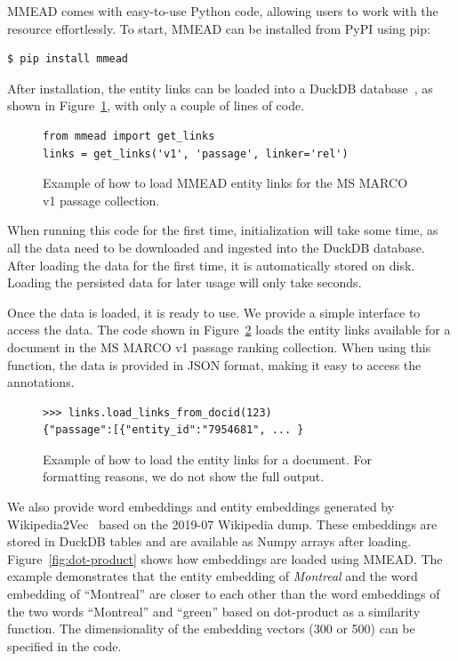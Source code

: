 MMEAD comes with easy-to-use Python code, allowing users to work with the resource effortlessly. To start, MMEAD can be installed from PyPI using pip:

\begin{verbatim}
$ pip install mmead
\end{verbatim}

After installation, the entity links can be loaded into a DuckDB database~\citep{duckdb}, as shown in Figure~\ref{fig:load-links}, with only a couple of lines of code.
%
\begin{figure}
\begin{verbatim}
from mmead import get_links
links = get_links('v1', 'passage', linker='rel')
\end{verbatim}
\caption{Example of how to load MMEAD entity links for the MS MARCO v1 passage collection.}
\label{fig:load-links}
\end{figure}
%
When running this code for the first time, initialization will take some time, as all the data need to be downloaded and ingested into the DuckDB database. After loading the data for the first time, it is automatically stored on disk. Loading the persisted data for later usage will only take seconds.

Once the data is loaded, it is ready to use. We provide a simple interface to access the data. The code shown in Figure~\ref{fig:load-links-for-document} loads the entity links available for a document in the MS MARCO v1 passage ranking collection. When using this function, the data is provided in JSON format, making it easy to access the annotations.

\begin{figure}
\begin{verbatim}
>>> links.load_links_from_docid(123)
{"passage":[{"entity_id":"7954681", ... }
\end{verbatim}
	\caption{Example of how to load the entity links for a document. For formatting reasons, we do not show the full output. }
	\label{fig:load-links-for-document}
\end{figure}

We also provide word embeddings and entity embeddings generated by Wikipedia2Vec~\citep{wikipedia2vec} based on the 2019-07 Wikipedia dump. These embeddings are stored in DuckDB tables and are available as Numpy arrays after loading. Figure~\ref{fig:dot-product} shows how embeddings are loaded using MMEAD. The example demonstrates that the entity embedding of \emph{Montreal} and the word embedding of ``Montreal'' are closer to each other than the word embeddings of the two words ``Montreal'' and ``green'' based on dot-product as a similarity function. The dimensionality of the embedding vectors (300 or 500) can be specified in the code.

